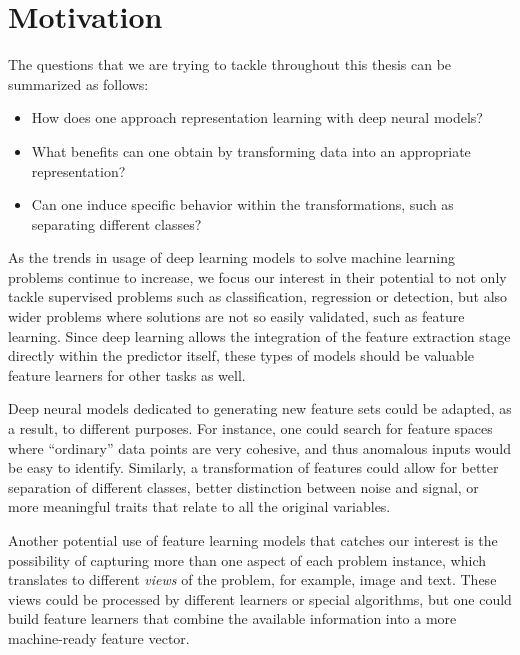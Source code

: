 \section{Motivation}

The questions that we are trying to tackle throughout this thesis can be summarized as follows:

\begin{itemize}
    \item How does one approach representation learning with deep neural models?
    \item What benefits can one obtain by transforming data into an appropriate representation?
    \item Can one induce specific behavior within the transformations, such as separating different classes?
\end{itemize}



As the trends in usage of deep learning models to solve machine learning problems continue to increase, we focus our interest in their potential to not only tackle supervised problems such as classification, regression or detection, but also wider problems where solutions are not so easily validated, such as feature learning. Since deep learning allows the integration of the feature extraction stage directly within the predictor itself, these types of models should be valuable feature learners for other tasks as well.


Deep neural models dedicated to generating new feature sets could be adapted, as a result, to different purposes. For instance, one could search for feature spaces where ``ordinary'' data points are very cohesive, and thus anomalous inputs would be easy to identify. Similarly, a transformation of features could allow for better separation of different classes, better distinction between noise and signal, or more meaningful traits that relate to all the original variables.


Another potential use of feature learning models that catches our interest is the possibility of capturing more than one aspect of each problem instance, which translates to different \textit{views} of the problem, for example, image and text. These views could be processed by different learners or special algorithms, but one could build feature learners that combine the available information into a more machine-ready feature vector.


